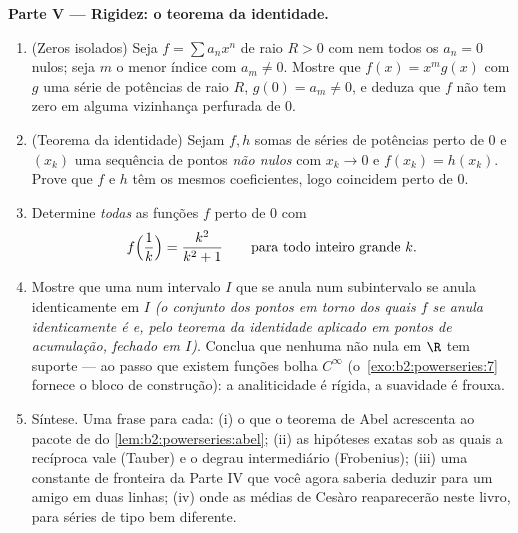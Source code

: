 \begin{problem}
\medskip
\noindent\textbf{Parte V --- Rigidez: o teorema da identidade.}
\begin{enumerate}[resume]
  \item (Zeros isolados) Seja $f = \sum a_nx^n$ de raio $R >
        0$ com nem todos os $a_n = 0$ nulos; seja $m$ o menor índice
        com $a_m \neq 0$. Mostre que $f(x) = x^m g(x)$ com $g$ uma
        série de potências de raio $R$, $g(0) = a_m \neq 0$, e
        deduza que $f$ não tem zero em alguma
        vizinhança perfurada de $0$.
  \item (Teorema da identidade) Sejam $f, h$ somas de séries de potências
        perto de $0$ e $(x_k)$ uma sequência de pontos \emph{não nulos}
        com $x_k \to 0$ e $f(x_k) = h(x_k)$. Prove
        que $f$ e $h$ têm os mesmos coeficientes, logo
        coincidem perto de $0$.
  \item Determine \emph{todas} as funções $f$  perto de $0$ com
        \[
        f\Bigl(\frac1k\Bigr) = \frac{k^2}{k^2+1}
        \qquad\text{para todo inteiro grande } k .
        \]
  \item Mostre que uma  num intervalo  $I$
        que se anula num subintervalo se anula identicamente em
        $I$ \emph{(o conjunto dos pontos em torno dos quais $f$ se anula
        identicamente é  e, pelo teorema da identidade
        aplicado em pontos de acumulação, fechado em $I$)}.
        Conclua que nenhuma  não nula em $\R$ tem
        suporte  --- ao passo que existem funções bolha
        $C^\infty$ (o~\cref{exo:b2:powerseries:7} fornece o
        bloco de construção): a analiticidade é rígida, a suavidade é
        frouxa.
  \item Síntese. Uma frase para cada: (i) o que o teorema de Abel
        acrescenta ao pacote de  do
        \cref{lem:b2:powerseries:abel}; (ii) as hipóteses exatas
        sob as quais a recíproca vale (Tauber) e
        o degrau intermediário (Frobenius); (iii) uma constante
        de fronteira da Parte IV que você agora saberia deduzir para um
        amigo em duas linhas; (iv) onde as médias de Cesàro
        reaparecerão neste livro, para séries de tipo bem
        diferente.
\end{enumerate}
\end{problem}
